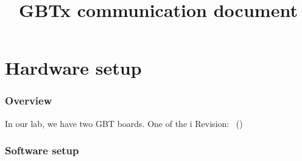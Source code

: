 \documentclass[11pt,letterpaper]{refart}
\title{GBTx communication document}
\begin{document}
\maketitle
\tableofcontents
\clearpage

\part{Hardware setup}
\section{Overview}
In our lab, we have two GBT boards. One of the i
Revision\gitVtags: \gitAbbrevHash~(\gitAuthorData)

\section{Software setup}
\end{document}
